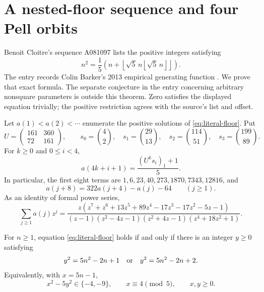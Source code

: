 \section{A nested-floor sequence and four Pell orbits}\label{sec:pell}

Benoit Cloitre's sequence A081097 lists the positive integers satisfying
\begin{equation}\label{eq:literal-floor}
 n^2=\frac15\left(n+
 \left\lfloor\sqrt5\,n\left\lfloor\sqrt5\,n\right\rfloor\right\rfloor\right).
\end{equation}
The entry records Colin Barker's 2013 empirical generating function
\cite{oeis081097}. We prove that exact formula. The separate conjecture
in the entry concerning arbitrary nonsquare parameters is outside this theorem.
Zero satisfies the displayed equation trivially; the positive restriction
agrees with the source's list and offset.

\begin{theorem}\label{thm:pell-main}
Let $a(1)<a(2)<\cdots$ enumerate the positive solutions of
\eqref{eq:literal-floor}. Put
\[
 U=\begin{pmatrix}161&360\\72&161\end{pmatrix},\qquad
 s_0=\binom42,\quad s_1=\binom{29}{13},\quad
 s_2=\binom{114}{51},\quad s_3=\binom{199}{89}.
\]
For $k\ge0$ and $0\le i<4$,
\[
 a(4k+i+1)=\frac{(U^ks_i)_1+1}{5}.
\]
In particular, the first eight terms are
$1,6,23,40,273,1870,7343,12816$, and
\begin{equation}\label{eq:pell-recurrence}
 a(j+8)=322a(j+4)-a(j)-64\qquad(j\ge1).
\end{equation}
As an identity of formal power series,
\begin{equation}\label{eq:pell-gf}
\sum_{j\ge1}a(j)z^j=
\frac{z(z^7+z^6+13z^5+89z^4-17z^3-17z^2-5z-1)}
{(z-1)(z^2-4z-1)(z^2+4z-1)(z^4+18z^2+1)}.
\end{equation}
\end{theorem}

\begin{lemma}\label{lem:floor-bridge}
For $n\ge1$, equation \eqref{eq:literal-floor} holds if and only if
there is an integer $y\ge0$ satisfying
\[
 y^2=5n^2-2n+1\quad\hbox{or}\quad y^2=5n^2-2n+2.
\]
Equivalently, with $x=5n-1$,
\begin{equation}\label{eq:pell-admissible}
 x^2-5y^2\in\{-4,-9\},\qquad x\equiv4\pmod5,\qquad x,y\ge0.
\end{equation}
\end{lemma}

